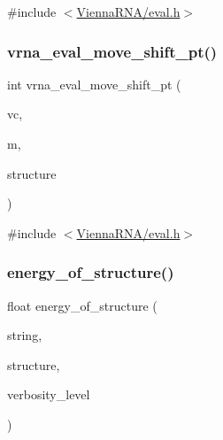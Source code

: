 {\ttfamily \#include $<$\mbox{\hyperlink{eval_8h}{Vienna\+R\+N\+A/eval.\+h}}$>$}

\mbox{\label{group__eval_gad8b0299608b6dd9f6e5554e939cdbbec}} 
\subsubsection{\texorpdfstring{vrna\+\_\+eval\+\_\+move\+\_\+shift\+\_\+pt()}{vrna\_eval\_move\_shift\_pt()}}
{\footnotesize\ttfamily int vrna\+\_\+eval\+\_\+move\+\_\+shift\+\_\+pt (\begin{DoxyParamCaption}\item[{\mbox{\hyperlink{group__fold__compound_ga1b0cef17fd40466cef5968eaeeff6166}{vrna\+\_\+fold\+\_\+compound\+\_\+t}} $\ast$}]{vc,  }\item[{\mbox{\hyperlink{group__neighbors_ga08630e00206cd163ea29c462bf5f4755}{vrna\+\_\+move\+\_\+t}} $\ast$}]{m,  }\item[{short $\ast$}]{structure }\end{DoxyParamCaption})}



{\ttfamily \#include $<$\mbox{\hyperlink{eval_8h}{Vienna\+R\+N\+A/eval.\+h}}$>$}

\mbox{\label{group__eval_gaf93986cb3cb29770ec9cca69c9fab8cf}} 
\subsubsection{\texorpdfstring{energy\+\_\+of\+\_\+structure()}{energy\_of\_structure()}}
{\footnotesize\ttfamily float energy\+\_\+of\+\_\+structure (\begin{DoxyParamCaption}\item[{const char $\ast$}]{string,  }\item[{const char $\ast$}]{structure,  }\item[{int}]{verbosity\+\_\+level }\end{DoxyParamCaption})}



